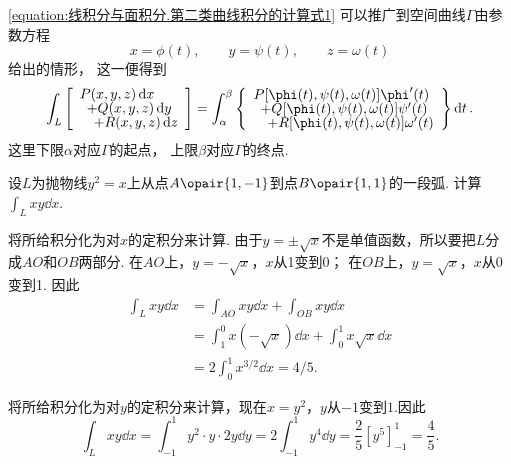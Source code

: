 \cref{equation:线积分与面积分.第二类曲线积分的计算式1} 可以推广到空间曲线\(\Gamma\)由参数方程\[
	x=\phi(t), \qquad
	y=\psi(t), \qquad
	z=\omega(t)
\]给出的情形，
这一便得到
\begin{equation}\label{equation:线积分与面积分.第二类曲线积分的计算式2}
	\int_L \left[ \def\arraystretch{.7}\begin{array}{l}
		P(x,y,z)\dd{x} \\
		\hspace{5pt}+ Q(x,y,z)\dd{y} \\
		\hspace{10pt}+ R(x,y,z)\dd{z}
	\end{array} \right]
	= \int_\alpha^\beta \left\{\def\arraystretch{.7}\begin{array}{l}
	P[\phi(t),\psi(t),\omega(t)] \phi'(t) \\
	\hspace{5pt}+ Q[\phi(t),\psi(t),\omega(t)] \psi'(t) \\
	\hspace{10pt}+ R[\phi(t),\psi(t),\omega(t)] \omega'(t)
	\end{array} \right\} \dd{t}.
\end{equation}
这里下限\(\alpha\)对应\(\Gamma\)的起点，
上限\(\beta\)对应\(\Gamma\)的终点.

\begin{example}
设\(L\)为抛物线\(y^2 = x\)上从点\(A\opair{1,-1}\)到点\(B\opair{1,1}\)的一段弧.
计算\(\int_L xy \dd{x}\).
\begin{solution}[解法一]
将所给积分化为对\(x\)的定积分来计算.
由于\(y = \pm\sqrt{x}\)不是单值函数，所以要把\(L\)分成\(AO\)和\(OB\)两部分.
在\(AO\)上，\(y=-\sqrt{x}\)，\(x\)从1变到0；
在\(OB\)上，\(y=\sqrt{x}\)，\(x\)从0变到1.
因此\begin{align*}
\int_L xy \dd{x} &= \int_{AO} xy \dd{x} + \int_{OB} xy \dd{x} \\
&= \int_1^0 x(-\sqrt{x}) \dd{x} + \int_0^1 x\sqrt{x} \dd{x} \\
&= 2\int_0^1 x^{3/2} \dd{x} = 4/5.
\end{align*}
\end{solution}
\begin{solution}[解法二]
将所给积分化为对\(y\)的定积分来计算，现在\(x=y^2\)，\(y\)从\(-1\)变到\(1\).因此\[
\int_L xy \dd{x}
= \int_{-1}^1 y^2 \cdot y \cdot 2y \dd{y}
= 2\int_{-1}^1 y^4 \dd{y}
= \frac{2}{5} [y^5]_{-1}^1
= \frac{4}{5}.
\]
\end{solution}
\end{example}

